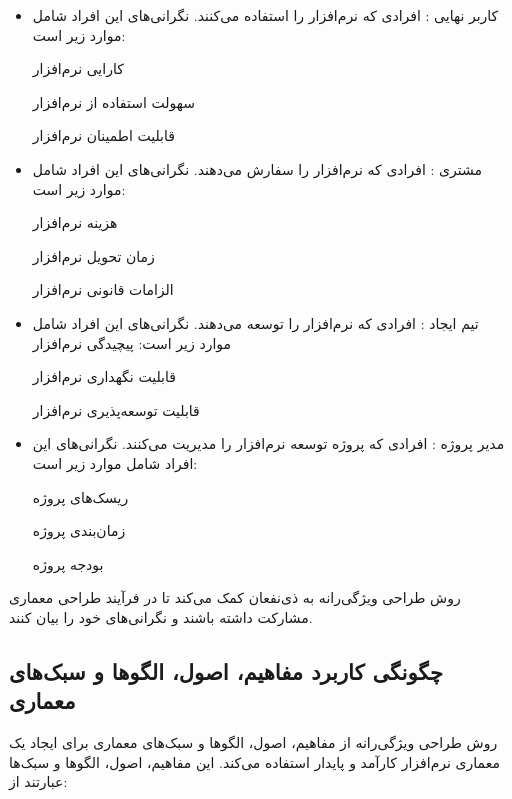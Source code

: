 \begin{itemize}
	\item کاربر نهایی  :
	افرادی که نرم‌افزار را استفاده می‌کنند. نگرانی‌های این افراد شامل موارد زیر است:
	
	کارایی نرم‌افزار
	
	سهولت استفاده از نرم‌افزار
	
	قابلیت اطمینان نرم‌افزار
	
	\item مشتری  :
	افرادی که نرم‌افزار را سفارش می‌دهند. نگرانی‌های این افراد شامل موارد زیر است:
	
	هزینه نرم‌افزار
	
	زمان تحویل نرم‌افزار
	
	الزامات قانونی نرم‌افزار
	
	\item تیم ایجاد  :
	افرادی که نرم‌افزار را توسعه می‌دهند. نگرانی‌های این افراد شامل موارد زیر است:
	پیچیدگی نرم‌افزار
	
	قابلیت نگهداری نرم‌افزار
	
	قابلیت توسعه‌پذیری نرم‌افزار
	
	\item مدیر پروژه  :
	افرادی که پروژه توسعه نرم‌افزار را مدیریت می‌کنند. نگرانی‌های این افراد شامل موارد زیر است:
	
	ریسک‌های پروژه
	
	زمان‌بندی پروژه
	
	بودجه پروژه
\end{itemize}

روش طراحی ویژگی‌رانه به ذی‌نفعان کمک می‌کند تا در فرآیند طراحی معماری مشارکت داشته باشند و نگرانی‌های خود را بیان کنند.

\subsection*{چگونگی کاربرد مفاهیم، اصول، الگوها و سبک‌های معماری}

روش طراحی ویژگی‌رانه از مفاهیم، اصول، الگوها و سبک‌های معماری برای ایجاد یک معماری نرم‌افزار کارآمد و پایدار استفاده می‌کند. این مفاهیم، اصول، الگوها و سبک‌ها عبارتند از:


